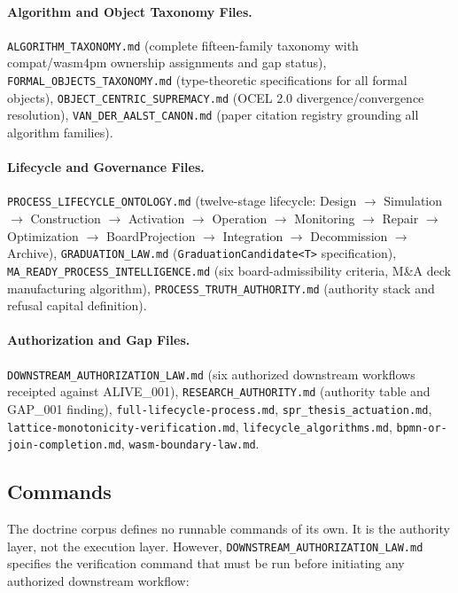 \paragraph{Algorithm and Object Taxonomy Files.} \texttt{ALGORITHM\_TAXONOMY.md} (complete
fifteen-family taxonomy with compat/wasm4pm ownership assignments and gap status),
\texttt{FORMAL\_OBJECTS\_TAXONOMY.md} (type-theoretic specifications for all formal
objects), \texttt{OBJECT\_CENTRIC\_SUPREMACY.md} (OCEL 2.0 divergence/convergence
resolution), \texttt{VAN\_DER\_AALST\_CANON.md} (paper citation registry grounding all
algorithm families).

\paragraph{Lifecycle and Governance Files.} \texttt{PROCESS\_LIFECYCLE\_ONTOLOGY.md}
(twelve-stage lifecycle: Design $\to$ Simulation $\to$ Construction $\to$ Activation $\to$
Operation $\to$ Monitoring $\to$ Repair $\to$ Optimization $\to$ BoardProjection $\to$
Integration $\to$ Decommission $\to$ Archive), \texttt{GRADUATION\_LAW.md}
(\texttt{GraduationCandidate\textless{}T\textgreater{}} specification),
\texttt{MA\_READY\_PROCESS\_INTELLIGENCE.md} (six board-admissibility criteria, M\&A deck
manufacturing algorithm), \texttt{PROCESS\_TRUTH\_AUTHORITY.md} (authority stack and
refusal capital definition).

\paragraph{Authorization and Gap Files.} \texttt{DOWNSTREAM\_AUTHORIZATION\_LAW.md} (six
authorized downstream workflows receipted against ALIVE\_001),
\texttt{RESEARCH\_AUTHORITY.md} (authority table and GAP\_001 finding),
\texttt{full-lifecycle-process.md}, \texttt{spr\_thesis\_actuation.md},
\texttt{lattice-monotonicity-verification.md}, \texttt{lifecycle\_algorithms.md},
\texttt{bpmn-or-join-completion.md}, \texttt{wasm-boundary-law.md}.

\subsection{Commands}
\label{sec:doctrine-implementation-commands}

The doctrine corpus defines no runnable commands of its own. It is the authority layer, not
the execution layer. However, \texttt{DOWNSTREAM\_AUTHORIZATION\_LAW.md} specifies the
verification command that must be run before initiating any authorized downstream workflow:

